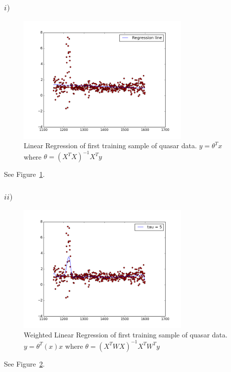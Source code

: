 \documentclass[11pt]{article}
\begin{document}
\subsubsection*{$i)$}
\begin{figure}
	\centering
	\includegraphics[width=0.75\textwidth]{../p5b1.png}
	\caption{ Linear Regression of first training sample of quasar data. $y=\theta^Tx$ where $\theta=(X^TX)^{-1}X^Ty$}
	\label{fig:5b1}
\end{figure}

See Figure~\ref{fig:5b1}.

\subsubsection*{$ii)$}
\begin{figure}
	\centering
	\includegraphics[width=0.75\textwidth]{../p5b2.png}
	\caption{ Weighted Linear Regression of first training sample of quasar data. $y=\theta^T(x)x$ where $\theta=(X^TWX)^{-1}X^TW^Ty$}
	\label{fig:5b2}
\end{figure}

See Figure~\ref{fig:5b2}.
\end{document}
